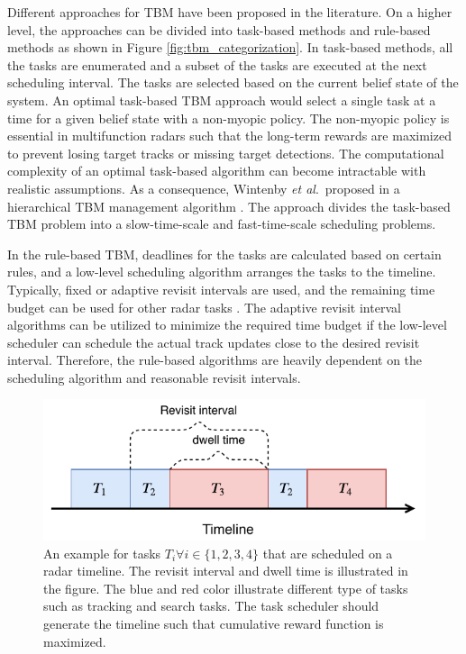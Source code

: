 \documentclass[english, 12pt, a4paper, elec, utf8, a-1b, online]{aaltothesis}
\newcommand{\etal}{\textit{et al}.~}
\begin{document}
Different approaches for TBM have been proposed in the literature.
On a higher level, the approaches can be divided into task-based methods and rule-based methods as shown in Figure \ref{fig:tbm_categorization}.
In task-based methods, all the tasks are enumerated and a subset of the tasks are executed at the next scheduling interval.
The tasks are selected based on the current belief state of the system. 
An optimal task-based TBM approach would select a single task at a time for a given belief state with a non-myopic policy.
The non-myopic policy is essential in multifunction radars such that the long-term rewards are maximized to prevent losing target tracks or missing target detections.
The computational complexity of an optimal task-based algorithm can become intractable with realistic assumptions. 
As a consequence, Wintenby \etal proposed in \cite{Wintenby2006} a hierarchical TBM management algorithm \cite{Wintenby2006}.
The approach divides the task-based TBM problem into a slow-time-scale and fast-time-scale scheduling problems.

In the rule-based TBM, deadlines for the tasks are calculated based on certain rules, and a low-level scheduling algorithm arranges the tasks to the timeline.
Typically, fixed or adaptive revisit intervals are used, and the remaining time budget can be used for other radar tasks  \cite{Keuk1975, Cohen1986, Gardner1988, Munu1992, vanKeuk1993, Watson1993, Daeipour1994, Shin1995, Benoudnine2006, ChengTing2007, Baek2010, Charlish2015, Mofrad2017, MasoumiGanjgah2017, Christiansen2018, Pilte2018}.
The adaptive revisit interval algorithms can be utilized to minimize the required time budget if the low-level scheduler can schedule the actual track updates close to the desired revisit interval.
Therefore, the rule-based algorithms are heavily dependent on the scheduling algorithm and reasonable revisit intervals.


\begin{figure}[h]
    \centering
    \includegraphics{figures/timeline.pdf}
    \caption{
        An example for tasks $T_i \forall i\in\{1,2,3,4\}$ that are scheduled on a radar timeline. 
        The revisit interval and dwell time is illustrated in the figure.
        The blue and red color illustrate different type of tasks such as tracking and search tasks.
        The task scheduler should generate the timeline such that cumulative reward function is maximized. 
    }
    \label{fig:timeline}
\end{figure}
\end{document}
